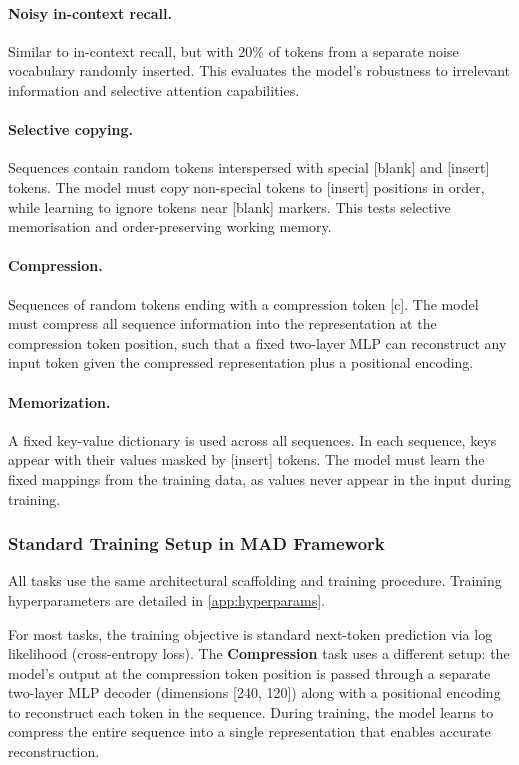 \documentclass{article}
\begin{document}
\paragraph{Noisy in-context recall.}
Similar to in-context recall, but with 20\% of tokens from a separate noise vocabulary randomly inserted. This evaluates the model's robustness to irrelevant information and selective attention capabilities.

\paragraph{Selective copying.}
Sequences contain random tokens interspersed with special [blank] and [insert] tokens. The model must copy non-special tokens to [insert] positions in order, while learning to ignore tokens near [blank] markers. This tests selective memorisation and order-preserving working memory.

\paragraph{Compression.}
Sequences of random tokens ending with a compression token [c]. The model must compress all sequence information into the representation at the compression token position, such that a fixed two-layer MLP can reconstruct any input token given the compressed representation plus a positional encoding.

\paragraph{Memorization.}
A fixed key-value dictionary is used across all sequences. In each sequence, keys appear with their values masked by [insert] tokens. The model must learn the fixed mappings from the training data, as values never appear in the input during training.

\subsubsection{Standard Training Setup in MAD Framework}
\label{sec:mad-training}

All tasks use the same architectural scaffolding and training procedure. Training hyperparameters are detailed in \cref{app:hyperparams}.

For most tasks, the training objective is standard next-token prediction via log likelihood (cross-entropy loss). The \textbf{Compression} task uses a different setup: the model's output at the compression token position is passed through a separate two-layer MLP decoder (dimensions [240, 120]) along with a positional encoding to reconstruct each token in the sequence. During training, the model learns to compress the entire sequence into a single representation that enables accurate reconstruction.
\end{document}
